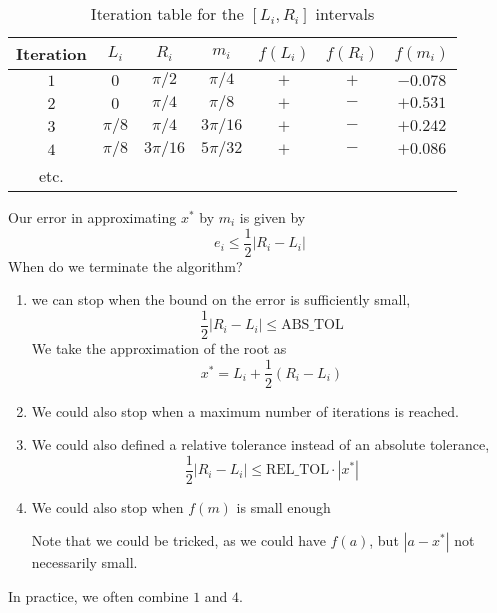 \begin{example}
    \begin{table}[H]
        \centering
        \begin{tabular}{c|c|c|c|c|c|c}
            Iteration & \( L_i \)    & \( R_i \)    & \( m_i \)
                      & \( f(L_i) \) & \( f(R_i) \) & \( f(m_i) \) \\ \hline
            \(1\)     & \(0\)        & \(\pi/2\)    & \(\pi/4\)
                      & \(+\)        & \(+\)        & \( -0.078 \) \\
            \(2\)     & \(0\)        & \(\pi/4\)    & \(\pi/8\)
                      & \(+\)        & \(-\)        & \( +0.531 \) \\
            \(3\)     & \(\pi/8\)    & \(\pi/4\)    & \(3\pi/16\)
                      & \(+\)        & \(-\)        & \( +0.242 \) \\
            \(4\)     & \(\pi/8\)    & \(3\pi/16\)  & \(5\pi/32\)
                      & \(+\)        & \(-\)        & \( +0.086 \) \\
            etc.
        \end{tabular}
        \caption{Iteration table for the \( [L_i, R_i] \) intervals}
    \end{table}
    Our error in approximating \( x^\ast \) by \( m_i \) is given by \[
        e_i \leq \frac{1}{2} | R_i - L_i |
    \]
    When do we terminate the algorithm?

    \begin{enumerate}
        \item we can stop when the bound on the error is sufficiently small, \[
                  \frac{1}{2} | R_i - L_i | \leq \text{ABS\_TOL}
              \] We take the approximation of the root as \[
                  x^\ast = L_i + \frac{1}{2} (R_i - L_i)
              \]
        \item We could also stop when a maximum number of iterations is reached.
        \item We could also defined a relative tolerance instead of an absolute tolerance, \[
                  \frac{1}{2} | R_i - L_i | \leq \text{REL\_TOL} \cdot | x^\ast |
              \]
        \item We could also stop when \( f(m) \) is small enough

              Note that we could be tricked, as we could have \( f(a) \), but \( | a - x^\ast | \) not necessarily small.
    \end{enumerate}

    In practice, we often combine \( 1 \) and \( 4 \).
\end{example}

